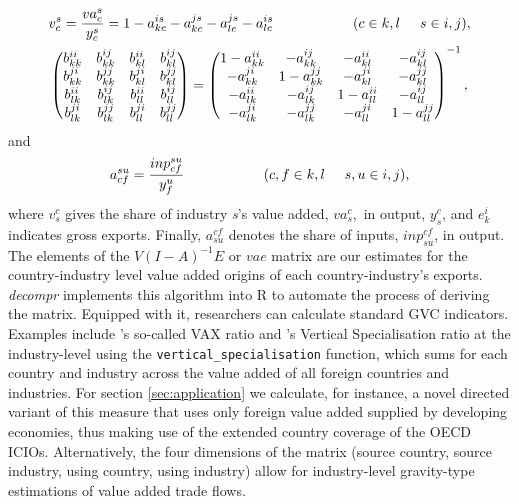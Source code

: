\documentclass[a4paper,11pt]{article}
\begin{document}
\begin{align*}
&v_{c}^{s} = \frac{va_{c}^{s}}{y_{c}^{s}} = 1 - a_{kc}^{is} - a_{kc}^{js} - a_{lc}^{js} - a_{lc}^{is} \hspace{2cm} (c \in k,l \hspace{.5cm} s \in i,j),\\
&\begin{pmatrix}
b_{kk}^{ii}& b_{kk}^{ij}& b_{kl}^{ii}& b_{kl}^{ij}\\
b_{kk}^{ji}& b_{kk}^{jj}& b_{kl}^{ji}& b_{kl}^{jj}\\
b_{lk}^{ii}& b_{lk}^{ij}& b_{ll}^{ii}& b_{ll}^{ij}\\
b_{lk}^{ji}& b_{lk}^{jj}& b_{ll}^{ji}& b_{ll}^{jj}
\end{pmatrix}
=
\begin{pmatrix}
1-a_{kk}^{ii}& -a_{kk}^{ij}& -a_{kl}^{ii}& -a_{kl}^{ij}\\
-a_{kk}^{ji}& 1-a_{kk}^{jj}& -a_{kl}^{ji}& -a_{kl}^{jj}\\
-a_{lk}^{ii}& -a_{lk}^{ij}& 1-a_{ll}^{ii}& -a_{ll}^{ij}\\
-a_{lk}^{ji}& -a_{lk}^{jj}& -a_{ll}^{ji}& 1-a_{ll}^{jj}
\end{pmatrix}^{-1},
\end{align*}
and
\begin{equation*}
a_{cf}^{su} = \frac{inp_{cf}^{su}}{y_{f}^{u}}  \hspace{2cm} (c,f \in k,l \hspace{.5cm} s,u \in i,j),
\end{equation*}
where \(v_{s}^{c}\) gives the share of industry \emph{s}'s value added, \(va_{s}^{c},\) in output, \(y_{s}^{c}\), and \(e_{k}^{i}\) indicates gross exports. Finally, \(a_{su}^{cf}\) denotes the share of inputs, \(inp_{su}^{cf}\), in output.
The elements of the $V(I-A)^{-1}E$ or $vae$ matrix are our estimates for the country-industry level value added
origins of each country-industry's exports.
\textit{decompr} implements this algorithm into R to automate the process of deriving the matrix. 
Equipped with it, researchers can calculate standard GVC indicators.
Examples include \citet{rojoguno12b}'s so-called VAX ratio and \citet{dahuetal01}'s Vertical Specialisation ratio at the industry-level using the \verb!vertical_specialisation! function, 
which sums for each country and industry across the value added of all foreign countries and industries. For section \ref{sec:application} we calculate, for instance, a novel directed variant of this measure that uses only foreign value added supplied by developing economies, thus making use of the extended country coverage of the OECD ICIOs.
Alternatively, the four dimensions of the matrix (source country, source industry, using country, using industry) allow for industry-level gravity-type estimations of value added trade flows.
\end{document}
